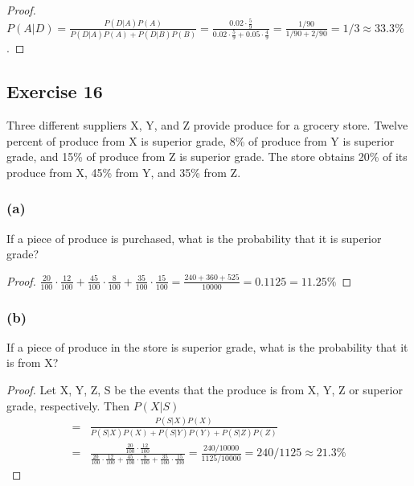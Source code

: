 \documentclass[14pt]{extarticle}
\newcommand{\dps}{\displaystyle}
\begin{document}
\begin{proof}
     \(P(A|D) = \frac{P(D|A)P(A)}{P(D|A)P(A) + P(D|B)P(B)} = \frac{0.02 \cdot \frac{5}{9}}{0.02 \cdot \frac{5}{9} + 0.05
          \cdot \frac{4}{9}} = \frac{1/90}{1/90 + 2/90} = 1/3 \approx 33.3\%\).
\end{proof}

\subsection{Exercise 16}
Three different suppliers X, Y, and Z provide produce for a grocery store. Twelve percent of produce from X is superior
grade, 8\% of produce from Y is superior grade, and 15\% of produce from Z is superior grade. The store obtains 20\% of
its produce from X, 45\% from Y, and 35\% from Z.

\subsubsection{(a)}
If a piece of produce is purchased, what is the probability that it is superior grade?

\begin{proof}
     \(\dps \frac{20}{100} \cdot \frac{12}{100} + \frac{45}{100} \cdot \frac{8}{100} + \frac{35}{100} \cdot \frac{15}{100} =
     \frac{240+360+525}{10000} = 0.1125 = 11.25\%\)
\end{proof}

\subsubsection{(b)}
If a piece of produce in the store is superior grade, what is the probability that it is from X?

\begin{proof}
     Let X, Y, Z, S be the events that the produce is from X, Y, Z or superior grade, respectively. Then \(P(X|S)\)
     \[
          \begin{array}{cl}
               = & \dps \frac{P(S|X)P(X)}{P(S|X)P(X) + P(S|Y)P(Y) + P(S|Z)P(Z)} \\
               = & \dps \frac{\frac{20}{100} \cdot \frac{12}{100}}
               {\frac{20}{100} \cdot \frac{12}{100} + \frac{45}{100} \cdot \frac{8}{100} + \frac{35}{100} \cdot \frac{15}{100}}
               = \dps \frac{240/10000}{1125/10000} = 240/1125 \approx 21.3\%
          \end{array}
     \]
\end{proof}
\end{document}
